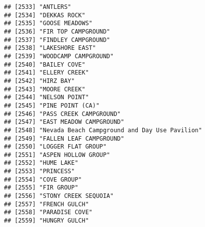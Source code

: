 \documentclass[
]{article}
\begin{document}
\begin{verbatim}
## [2533] "ANTLERS"                                                                             
## [2534] "DEKKAS ROCK"                                                                         
## [2535] "GOOSE MEADOWS"                                                                       
## [2536] "FIR TOP CAMPGROUND"                                                                  
## [2537] "FINDLEY CAMPGROUND"                                                                  
## [2538] "LAKESHORE EAST"                                                                      
## [2539] "WOODCAMP CAMPGROUND"                                                                 
## [2540] "BAILEY COVE"                                                                         
## [2541] "ELLERY CREEK"                                                                        
## [2542] "HIRZ BAY"                                                                            
## [2543] "MOORE CREEK"                                                                         
## [2544] "NELSON POINT"                                                                        
## [2545] "PINE POINT (CA)"                                                                     
## [2546] "PASS CREEK CAMPGROUND"                                                               
## [2547] "EAST MEADOW CAMPGROUND"                                                              
## [2548] "Nevada Beach Campground and Day Use Pavilion"                                        
## [2549] "FALLEN LEAF CAMPGROUND"                                                              
## [2550] "LOGGER FLAT GROUP"                                                                   
## [2551] "ASPEN HOLLOW GROUP"                                                                  
## [2552] "HUME LAKE"                                                                           
## [2553] "PRINCESS"                                                                            
## [2554] "COVE GROUP"                                                                          
## [2555] "FIR GROUP"                                                                           
## [2556] "STONY CREEK SEQUOIA"                                                                 
## [2557] "FRENCH GULCH"                                                                        
## [2558] "PARADISE COVE"                                                                       
## [2559] "HUNGRY GULCH"                                                                        

\end{verbatim}
\end{document}
